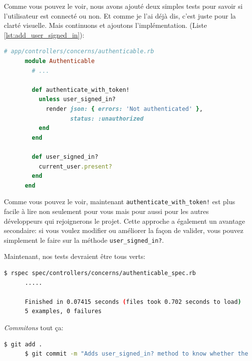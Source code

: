 \documentclass[]{report}
\begin{document}
    Comme vous pouvez le voir, nous avons ajouté deux simples tests pour savoir si l'utilisateur est connecté ou non. Et comme je l'ai déjà dis, c'est juste pour la clarté visuelle. Mais continuons et ajoutons l'implémentation. (Liste \ref{lst:add_user_signed_in}):

    \begin{scriptsize}
      \begin{lstlisting}[language=ruby, caption={Implémetation de  user\_signed\_in?}, label={lst:add_user_signed_in}]
      # app/controllers/concerns/authenticable.rb
      module Authenticable
        # ...

        def authenticate_with_token!
          unless user_signed_in?
            render json: { errors: 'Not authenticated' },
                   status: :unauthorized
          end
        end

        def user_signed_in?
          current_user.present?
        end
      end
      \end{lstlisting}
    \end{scriptsize}

    Comme vous pouvez le voir, maintenant \verb|authenticate_with_token!| est plus facile à lire non seulement pour vous mais pour aussi pour les autres développeurs qui rejoignerons le projet. Cette approche a également un avantage secondaire: si vous voulez modifier ou améliorer la façon de valider, vous pouvez simplement le faire sur la méthode \verb|user_signed_in?|.

    Maintenant, nos tests devraient être tous verts:

    \begin{scriptsize}
      \begin{lstlisting}[language=bash]
      $ rspec spec/controllers/concerns/authenticable_spec.rb
      .....

      Finished in 0.07415 seconds (files took 0.702 seconds to load)
      5 examples, 0 failures
      \end{lstlisting}
    \end{scriptsize}

    \textit{Commitons} tout ça:

    \begin{scriptsize}
      \begin{lstlisting}[language=bash]
      $ git add .
      $ git commit -m "Adds user_signed_in? method to know whether the user is logged in or not"
      \end{lstlisting}
    \end{scriptsize}
\end{document}
